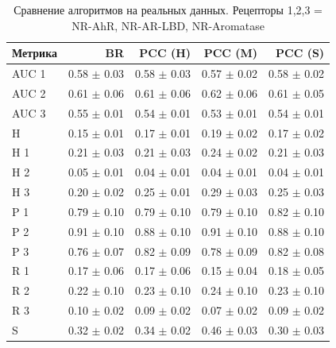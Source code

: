 \documentclass{ITaSconf}
\newcommand\headline{\hline}
\begin{document}
\begin{table}[p]%
	\caption{Сравнение алгоритмов на реальных данных. Рецепторы 1,2,3 = NR-AhR, NR-AR-LBD, NR-Aromatase}
	\label{t:realData}
	\centering\medskip%
	\begin{tabular}{lrrrr}
		\headline
		{Метрика} &             BR &           PCC (H) &          PCC (M) &           PCC (S) \\
		\headline
		AUC 1 &   0.58 $\pm$ 0.03 &    0.58 $\pm$ 0.03 &    0.57 $\pm$ 0.02 &    0.58 $\pm$ 0.02 \\
		AUC 2 &   0.61 $\pm$ 0.06 &    0.61 $\pm$ 0.06 &    0.62 $\pm$ 0.06 &    0.61 $\pm$ 0.05 \\
		AUC 3 &   0.55 $\pm$ 0.01 &    0.54 $\pm$ 0.01 &    0.53 $\pm$ 0.01 &    0.54 $\pm$ 0.01 \\
		H     &   0.15 $\pm$ 0.01 &    0.17 $\pm$ 0.01 &    0.19 $\pm$ 0.02 &    0.17 $\pm$ 0.02 \\
		H 1   &   0.21 $\pm$ 0.03 &    0.21 $\pm$ 0.03 &    0.24 $\pm$ 0.02 &    0.21 $\pm$ 0.03 \\
		H 2   &  0.05 $\pm$ 0.01 &  0.04 $\pm$ 0.01 &  0.04 $\pm$ 0.01 &  0.04 $\pm$ 0.01 \\
		H 3   &    0.20 $\pm$ 0.02 &    0.25 $\pm$ 0.01 &    0.29 $\pm$ 0.03 &    0.25 $\pm$ 0.03 \\
		P 1   &    0.79 $\pm$ 0.10 &     0.79 $\pm$ 0.10 &     0.79 $\pm$ 0.10 &     0.82 $\pm$ 0.10 \\
		P 2   &    0.91 $\pm$ 0.10 &     0.88 $\pm$ 0.10 &     0.91 $\pm$ 0.10 &     0.88 $\pm$ 0.10 \\
		P 3   &   0.76 $\pm$ 0.07 &    0.82 $\pm$ 0.09 &    0.78 $\pm$ 0.09 &    0.82 $\pm$ 0.08 \\
		R 1   &   0.17 $\pm$ 0.06 &    0.17 $\pm$ 0.06 &    0.15 $\pm$ 0.04 &    0.18 $\pm$ 0.05 \\
		R 2   &    0.22 $\pm$ 0.10 &     0.23 $\pm$ 0.10 &     0.24 $\pm$ 0.10 &     0.23 $\pm$ 0.10 \\
		R 3   &    0.10 $\pm$ 0.02 &   0.09 $\pm$ 0.02 &   0.07 $\pm$ 0.02 &   0.09 $\pm$ 0.02 \\
		S     &   0.32 $\pm$ 0.02 &    0.34 $\pm$ 0.02 &    0.46 $\pm$ 0.03 &     0.30 $\pm$ 0.03 \\
		\headline
	\end{tabular}
\end{table}

\clearpage

\end{document}
